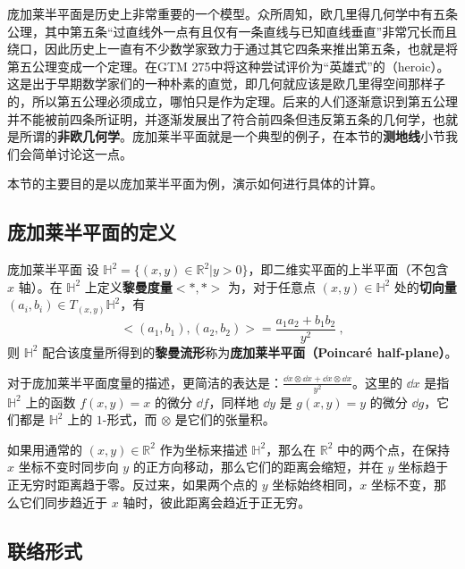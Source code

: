 
庞加莱半平面是历史上非常重要的一个模型。众所周知，欧几里得几何学中有五条公理，其中第五条“过直线外一点有且仅有一条直线与已知直线垂直”非常冗长而且绕口，因此历史上一直有不少数学家致力于通过其它四条来推出第五条，也就是将第五公理变成一个定理。在GTM 275\cite{GTM275}中将这种尝试评价为“英雄式”的（heroic）。这是出于早期数学家们的一种朴素的直觉，即几何就应该是欧几里得空间那样子的，所以第五公理必须成立，哪怕只是作为定理。后来的人们逐渐意识到第五公理并不能被前四条所证明，并逐渐发展出了符合前四条但违反第五条的几何学，也就是所谓的\textbf{非欧几何学}。庞加莱半平面就是一个典型的例子，在本节的\textbf{测地线}小节我们会简单讨论这一点。

本节的主要目的是以庞加莱半平面为例，演示如何进行具体的计算。

\subsection{庞加莱半平面的定义}

\begin{definition}{庞加莱半平面}
设 $\mathbb{H}^2=\{(x, y)\in \mathbb{R}^2|y>0\}$，即二维实平面的上半平面（不包含 $x$ 轴）。在 $\mathbb{H}^2$ 上定义\textbf{黎曼度量}$<*,*>$ 为，对于任意点 $(x, y)\in \mathbb{H}^2$ 处的\textbf{切向量}$(a_i, b_i)\in T_{(x, y)}\mathbb{H}^2$，有
\begin{equation}
<(a_1, b_1), (a_2, b_2)>=\frac{a_1a_2+b_1b_2}{y^2}~,
\end{equation}
则 $\mathbb{H}^2$ 配合该度量所得到的\textbf{黎曼流形}称为\textbf{庞加莱半平面（Poincaré half-plane）}。
\end{definition}

对于庞加莱半平面度量的描述，更简洁的表达是：$\frac{\dd x\otimes \dd x+ \dd x\otimes\dd x}{y^2}$。这里的 $\dd x$ 是指 $\mathbb{H}^2$ 上的函数 $f(x, y)=x$ 的微分 $\dd f$，同样地 $\dd y$ 是 $g(x, y)=y$ 的微分 $\dd g$，它们都是 $\mathbb{H}^2$ 上的 $1$-形式，而 $\otimes$ 是它们的张量积。

如果用通常的 $(x, y)\in \mathbb{R}^2$ 作为坐标来描述 $\mathbb{H}^2$，那么在 $\mathbb{R}^2$ 中的两个点，在保持 $x$ 坐标不变时同步向 $y$ 的正方向移动，那么它们的距离会缩短，并在 $y$ 坐标趋于正无穷时距离趋于零。反过来，如果两个点的 $y$ 坐标始终相同，$x$ 坐标不变，那么它们同步趋近于 $x$ 轴时，彼此距离会趋近于正无穷。

\subsection{联络形式}

